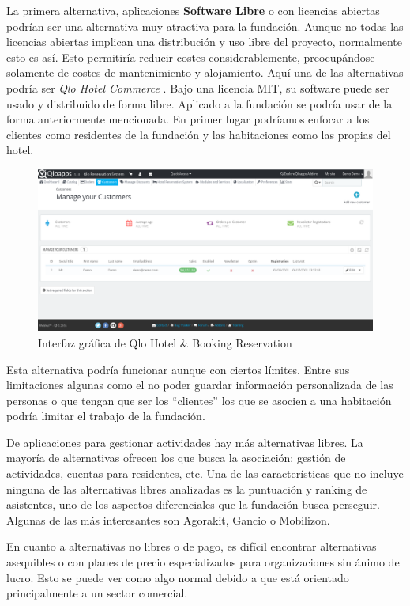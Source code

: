 La primera alternativa, aplicaciones \textbf{Software Libre} o con licencias abiertas podrían ser una alternativa muy atractiva para la fundación. Aunque no todas las licencias abiertas implican una distribución y uso libre del proyecto, normalmente esto es así. Esto permitiría reducir costes considerablemente, preocupándose solamente de costes de mantenimiento y alojamiento. Aquí una de las alternativas podría ser \textit{Qlo Hotel Commerce} \cite{qloapps}. Bajo una licencia MIT, su software puede ser usado y distribuido de forma libre. Aplicado a la fundación se podría usar de la forma anteriormente mencionada. En primer lugar podríamos enfocar a los clientes como residentes de la fundación y las habitaciones como las propias del hotel. 

\begin{figure}[htbp]
    \centerline{\includegraphics[scale=.5]{imagenes/estado_arte/qlo.png}}
    \caption{Interfaz gráfica de Qlo Hotel \& Booking Reservation}
    \label{fig}
\end{figure}

Esta alternativa podría funcionar aunque con ciertos límites. Entre sus limitaciones algunas como el no poder guardar información personalizada de las personas o que tengan que ser los ``clientes'' los que se asocien a una habitación podría limitar el trabajo de la fundación.

De aplicaciones para gestionar actividades hay más alternativas libres. La mayoría de alternativas ofrecen los que busca la asociación: gestión de actividades, cuentas para residentes, etc. Una de las características que no incluye ninguna de las alternativas libres analizadas es la puntuación y ranking de asistentes, uno de los aspectos diferenciales que la fundación busca perseguir. Algunas de las más interesantes son Agorakit, Gancio o Mobilizon.

En cuanto a alternativas no libres o de pago, es difícil encontrar alternativas asequibles o con planes de precio especializados para organizaciones sin ánimo de lucro. Esto se puede ver como algo normal debido a que está orientado principalmente a un sector comercial.

